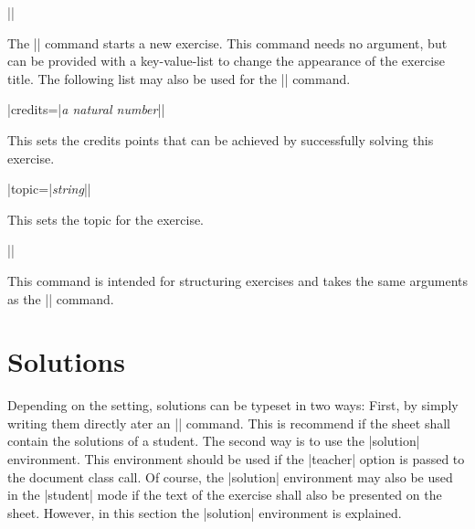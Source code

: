 \documentclass[a4paper,fleqn]{report}
\def\syntaxdefaultarg#1{\hfill\texttt{\small #1}\par\smallskip\noindent\ignorespaces}
\def\metaargument#1{\textit{\small #1}}
\begin{document}
\begin{syntax}
  |\exercise[|\metaargument{key-value-list}|]| \syntaxdefaultarg{}
  The |\exercise| command starts a new exercise. This command needs no
  argument, but can be provided with a key-value-list to change the
  appearance of the exercise title. The following list may also be
  used for the |\subexercise| command.
  \begin{syntax}
    |credits={|\metaargument{a natural number}|}| \syntaxdefaultarg{}
    This sets the credits points that can be achieved by successfully
    solving this exercise.
  \end{syntax}
  \begin{syntax}
    |topic={|\metaargument{string}|}| \syntaxdefaultarg{}
    This sets the topic for the exercise.
  \end{syntax}
\end{syntax}

\begin{syntax}
  |\subexercise[|\metaargument{key-value-list}|]| \syntaxdefaultarg{}
  This command is intended for structuring exercises and takes the
  same arguments as the |\exercise| command.
\end{syntax}


\section{Solutions}

Depending on the setting, solutions can be typeset in two ways: First,
by simply writing them directly ater an |\exercise| command. This is
recommend if the sheet shall contain the solutions of a student. The
second way is to use the |solution| environment. This environment
should be used if the |teacher| option is passed to the document class
call. Of course, the |solution| environment may also be used in
the |student| mode if the text of the exercise shall also be presented
on the sheet. However, in this section the |solution| environment is
explained.
\end{document}
